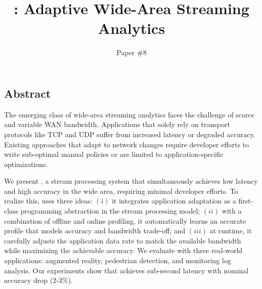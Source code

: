 \documentclass[twocolumn, 9pt]{article}
\begin{document}
\title{\sysname{}: Adaptive Wide-Area Streaming Analytics}
\author{Paper \#8}
\date{}
\maketitle

\subsection*{Abstract}

The emerging class of wide-area streaming analytics faces the challenge of
scarce and variable WAN bandwidth. Applications that solely rely on transport
protocols like TCP and UDP suffer from increased latency or degraded
accuracy. Existing approaches that adapt to network changes require developer
efforts  to write sub-optimal manual policies or are limited
to
application-specific optimizations.

We present \sysname{}, a stream processing system that simultaneously achieves
low latency and high accuracy in the wide area, requiring minimal developer
efforts. To realize this, \sysname{} uses three ideas: $(i)$ it integrates
application adaptation as a first-class programming abstraction in the stream
processing model; $(ii)$ with a combination of offline and online profiling, it
automatically learns an accurate profile that models accuracy and bandwidth
trade-off; and $(iii)$ at runtime, it carefully adjusts the application data
rate to match the available bandwidth while maximizing the achievable
accuracy. We evaluate \sysname{} with three real-world applications: augmented
reality, pedestrian detection, and monitoring log analysis. Our experiments show
that \sysname{} achieves sub-second latency with nominal accuracy drop (2-3\%).










% 

{\footnotesize 
}

% 
\end{document}
